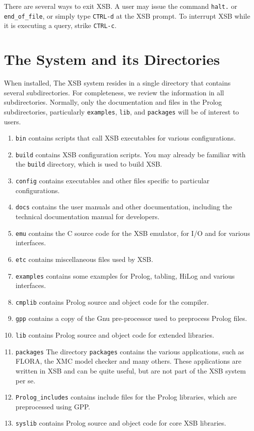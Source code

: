 There are several ways to exit XSB.  A user may issue the
command \verb'halt.' or \verb'end_of_file', or simply type
\verb'CTRL-d' at the XSB prompt.  To interrupt XSB
while it is executing a query, strike \verb'CTRL-c'.

\section{The System and its Directories}
When installed, The XSB system resides in a single directory that
contains several subdirectories.  For completeness, we review the
information in all subdirectories.  Normally, only the documentation
and files in the Prolog subdirectories, particularly {\tt examples},
{\tt lib}, and {\tt packages} will be of interest to users.
\begin{enumerate}
\item {\tt bin} contains scripts that call XSB executables
for various configurations.
%
\item {\tt build} contains XSB configuration scripts.  You may
already be familiar with the {\tt build} directory, which is used to
build XSB.
%
\item {\tt config} contains executables and other files specific to
particular configurations.
%
\item {\tt docs} contains the user manuals and other documentation,
including the technical documentation manual for developers.
%
\item {\tt emu} contains the C source code for the XSB emulator, for
I/O and for various interfaces.
%
\item {\tt etc} contains miscellaneous files used by XSB.
%
\item {\tt examples} contains some examples for Prolog, tabling,
HiLog and various interfaces.
%
\item {\tt cmplib} contains Prolog source and object code for the
compiler. 
%
\item {\tt gpp} contains a copy of the Gnu pre-processor used to
preprocess Prolog files.
%
\item {\tt lib} contains Prolog source and object code for extended
libraries. 
%
\item {\tt packages} The directory {\tt packages} contains the various
applications, such as FLORA, the XMC model checker and many others.
These applications are written in XSB and can be quite useful, but are
not part of the XSB system per se.
%
\item {\tt Prolog\_includes} contains include files for the Prolog
libraries, which are preprocessed using GPP.
%
\item {\tt syslib} contains Prolog source and object code for core XSB
libraries. 
\end{enumerate}

